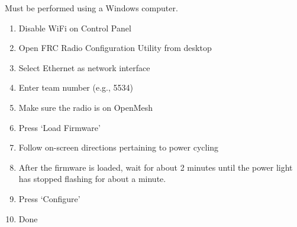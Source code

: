 Must be performed using a Windows computer.

\begin{enumerate}
\item Disable WiFi on Control Panel

\item Open FRC Radio Configuration Utility from desktop

\item Select Ethernet as network interface

\item Enter team number (e.g., 5534)

\item Make sure the radio is on OpenMesh

\item Press `Load Firmware'

\item Follow on-screen directions pertaining to power cycling

\item After the firmware is loaded, wait for about 2 minutes until the power light has stopped flashing for about a minute.

\item Press `Configure'

\item Done
\end{enumerate}

